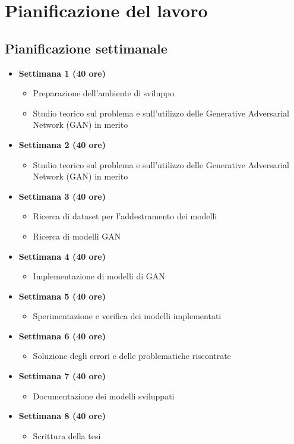 \section{Pianificazione del lavoro}
\subsection*{Pianificazione settimanale}
\begin{itemize}
  \item \textbf{Settimana 1 (40 ore)}
  \begin{itemize}
    \item Preparazione dell'ambiente di sviluppo
    \item Studio teorico sul problema e sull'utilizzo delle Generative Adversarial Network (GAN) in merito
  \end{itemize}

  \item \textbf{Settimana 2 (40 ore)}
  \begin{itemize}
    \item Studio teorico sul problema e sull'utilizzo delle Generative Adversarial Network (GAN) in merito
  \end{itemize}

  \item \textbf{Settimana 3 (40 ore)}
  \begin{itemize}
    \item Ricerca di dataset per l'addestramento dei modelli
    \item Ricerca di modelli GAN
  \end{itemize}

  \item \textbf{Settimana 4 (40 ore)}
  \begin{itemize}
    \item Implementazione di modelli di GAN
  \end{itemize}

  \item \textbf{Settimana 5 (40 ore)}
  \begin{itemize}
    \item Sperimentazione e verifica dei modelli implementati
  \end{itemize}

  \item \textbf{Settimana 6 (40 ore)}
  \begin{itemize}
    \item Soluzione degli errori e delle problematiche riscontrate
  \end{itemize}

  \item \textbf{Settimana 7 (40 ore)}
  \begin{itemize}
    \item Documentazione dei modelli sviluppati
  \end{itemize}

  \item \textbf{Settimana 8 (40 ore)}
  \begin{itemize}
    \item Scrittura della tesi
  \end{itemize}

\end{itemize}


